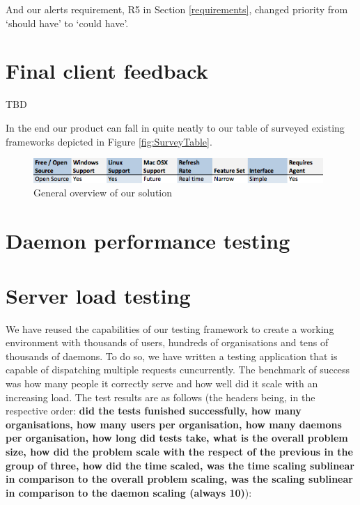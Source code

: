 \documentclass{l3proj}
\begin{document}
And our alerts requirement, R5 in Section \ref{requirements}, changed priority from `should have' to `could have'.

\section{Final client feedback}

TBD

In the end our product can fall in quite neatly to our table of surveyed existing frameworks depicted in Figure \ref{fig:SurveyTable}.

\begin{figure}[H]
\centering
\includegraphics[width=110mm]{Competitors/OurSolutionSurvey}
\caption{General overview of our solution}
\end{figure}


\section{Daemon performance testing}


\section{Server load testing}

We have reused the capabilities of our testing framework to create a working environment with thousands of users, hundreds of organisations and tens of thousands of daemons. To do so, we have written a testing application that is capable of dispatching multiple requests cuncurrently. The benchmark of success was how many people it correctly serve and how well did it scale with an increasing load. The test results are as follows (the headers being, in the respective order: \textbf{did the tests funished successfully, how many organisations, how many users per organisation, how many daemons per organisation, how long did tests take, what is the overall problem size, how did the problem scale with the respect of the previous in the group of three, how did the time scaled, was the time scaling sublinear in comparison to the overall problem scaling, was the scaling sublinear in comparison to the daemon scaling (always 10)}):
\end{document}
